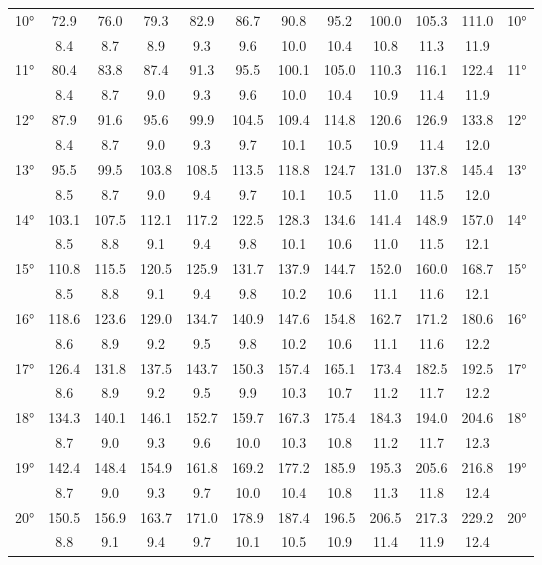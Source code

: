 \begin{scriptsize}
\begin{tabular}{c || c | c | c | c | c | c | c | c | c | c || c}
		\multirow{2}{*}{10°}&72.9&76.0&79.3&82.9&86.7&90.8&95.2&100.0&105.3&111.0&\multirow{2}{*}{10°}\\ \space&8.4&8.7&8.9&9.3&9.6&10.0&10.4&10.8&11.3&11.9&\space\\\hline
		\multirow{2}{*}{11°}&80.4&83.8&87.4&91.3&95.5&100.1&105.0&110.3&116.1&122.4&\multirow{2}{*}{11°}\\ \space&8.4&8.7&9.0&9.3&9.6&10.0&10.4&10.9&11.4&11.9&\space\\\hline
		\multirow{2}{*}{12°}&87.9&91.6&95.6&99.9&104.5&109.4&114.8&120.6&126.9&133.8&\multirow{2}{*}{12°}\\ \space&8.4&8.7&9.0&9.3&9.7&10.1&10.5&10.9&11.4&12.0&\space\\\hline
		\multirow{2}{*}{13°}&95.5&99.5&103.8&108.5&113.5&118.8&124.7&131.0&137.8&145.4&\multirow{2}{*}{13°}\\ \space&8.5&8.7&9.0&9.4&9.7&10.1&10.5&11.0&11.5&12.0&\space\\\hline
		\multirow{2}{*}{14°}&103.1&107.5&112.1&117.2&122.5&128.3&134.6&141.4&148.9&157.0&\multirow{2}{*}{14°}\\ \space&8.5&8.8&9.1&9.4&9.8&10.1&10.6&11.0&11.5&12.1&\space\\\hline
		\multirow{2}{*}{15°}&110.8&115.5&120.5&125.9&131.7&137.9&144.7&152.0&160.0&168.7&\multirow{2}{*}{15°}\\ \space&8.5&8.8&9.1&9.4&9.8&10.2&10.6&11.1&11.6&12.1&\space\\\hline
		\multirow{2}{*}{16°}&118.6&123.6&129.0&134.7&140.9&147.6&154.8&162.7&171.2&180.6&\multirow{2}{*}{16°}\\ \space&8.6&8.9&9.2&9.5&9.8&10.2&10.6&11.1&11.6&12.2&\space\\\hline
		\multirow{2}{*}{17°}&126.4&131.8&137.5&143.7&150.3&157.4&165.1&173.4&182.5&192.5&\multirow{2}{*}{17°}\\ \space&8.6&8.9&9.2&9.5&9.9&10.3&10.7&11.2&11.7&12.2&\space\\\hline
		\multirow{2}{*}{18°}&134.3&140.1&146.1&152.7&159.7&167.3&175.4&184.3&194.0&204.6&\multirow{2}{*}{18°}\\ \space&8.7&9.0&9.3&9.6&10.0&10.3&10.8&11.2&11.7&12.3&\space\\\hline
		\multirow{2}{*}{19°}&142.4&148.4&154.9&161.8&169.2&177.2&185.9&195.3&205.6&216.8&\multirow{2}{*}{19°}\\ \space&8.7&9.0&9.3&9.7&10.0&10.4&10.8&11.3&11.8&12.4&\space\\\hline
		\multirow{2}{*}{20°}&150.5&156.9&163.7&171.0&178.9&187.4&196.5&206.5&217.3&229.2&\multirow{2}{*}{20°}\\ \space&8.8&9.1&9.4&9.7&10.1&10.5&10.9&11.4&11.9&12.4&\space\\\hline

\end{tabular}
\end{scriptsize}
